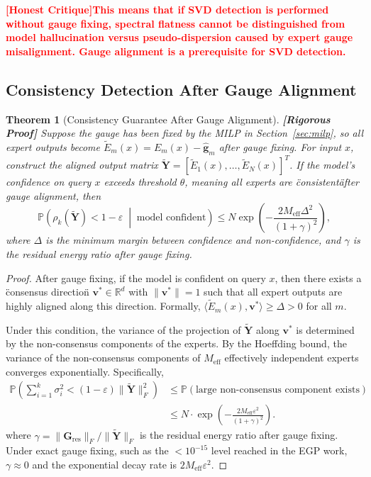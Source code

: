 \documentclass[12pt,a4paper]{article}
\newtheorem{theorem}{Theorem}[section]
\theoremstyle{remark}
\newcommand{\R}{\mathbb{R}}
\newcommand{\Pbb}{\mathbb{P}}
\newcommand{\honestcrit}[1]{%
    \textcolor{red}{\textbf{[Honest Critique]#1}}%
}
\newcommand{\rigorFull}{\textnormal{\textbf{[Rigorous Proof]}}}
\begin{document}
\honestcrit{This means that if SVD detection is performed without gauge fixing, spectral flatness cannot be distinguished from model hallucination versus pseudo-dispersion caused by expert gauge misalignment. Gauge alignment is a prerequisite for SVD detection.}

\subsection{Consistency Detection After Gauge Alignment}

\begin{theorem}[Consistency Guarantee After Gauge Alignment]\label{thm:aligned_svd}\rigorFull
Suppose the gauge has been fixed by the MILP in Section~\ref{sec:milp}, so all expert outputs become $\tilde{E}_m(x) = E_m(x) - \hat{\mathbf{g}}_m$ after gauge fixing. For input $x$, construct the aligned output matrix $\tilde{\mathbf{Y}} = [\tilde{E}_1(x), \ldots, \tilde{E}_N(x)]^T$. If the model's confidence on query $x$ exceeds threshold $\theta$, meaning all experts are \"consistent\" after gauge alignment, then
\begin{equation}
    \Pbb\left(\rho_k(\tilde{\mathbf{Y}}) < 1 - \varepsilon \;\middle|\; \text{model confident}\right) \leq N \exp\left(-\frac{2M_{\text{eff}} \Delta^2}{(1 + \gamma)^2}\right),
\end{equation}
where $\Delta$ is the minimum margin between confidence and non-confidence, and $\gamma$ is the residual energy ratio after gauge fixing.
\end{theorem}

\begin{proof}
After gauge fixing, if the model is confident on query $x$, then there exists a \"consensus direction\" $\mathbf{v}^* \in \R^d$ with $\|\mathbf{v}^*\| = 1$ such that all expert outputs are highly aligned along this direction. Formally, $\langle \tilde{E}_m(x), \mathbf{v}^* \rangle \geq \Delta > 0$ for all $m$.

Under this condition, the variance of the projection of $\tilde{\mathbf{Y}}$ along $\mathbf{v}^*$ is determined by the non-consensus components of the experts. By the Hoeffding bound, the variance of the non-consensus components of $M_{\text{eff}}$ effectively independent experts converges exponentially. Specifically,
\begin{align}
    \Pbb\left(\sum_{i=1}^{k} \sigma_i^2 < (1-\varepsilon)\|\tilde{\mathbf{Y}}\|_F^2\right) &\leq \Pbb\left(\text{large non-consensus component exists}\right) \\
    &\leq N \cdot \exp\left(-\frac{2M_{\text{eff}} \varepsilon^2}{(1+\gamma)^2}\right).
\end{align}
where $\gamma = \|\mathbf{G}_{\text{res}}\|_F / \|\tilde{\mathbf{Y}}\|_F$ is the residual energy ratio after gauge fixing. Under exact gauge fixing, such as the $<10^{-15}$ level reached in the EGP work, $\gamma \approx 0$ and the exponential decay rate is $2M_{\text{eff}}\varepsilon^2$.
\end{proof}
\end{document}
